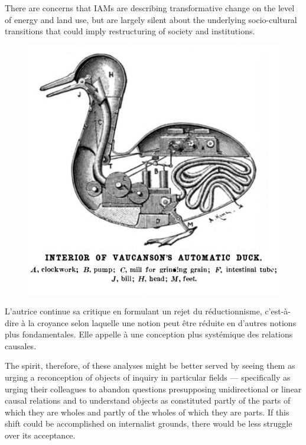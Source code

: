 \begin{authoredquote}
    There are concerns that IAMs are describing transformative change on the level of energy and land use, but are largely silent about the underlying socio-cultural transitions that could imply restructuring of society and institutions.
\end{authoredquote}


\begin{figure}
    \centering
    \includegraphics[width=0.6\linewidth]{reductionisme.png}
    \label{fig:reductionnisme}
\end{figure}



L'autrice continue sa critique en formulant un rejet du réductionnisme, c'est-à-dire à la croyance selon laquelle une notion peut être réduite en d'autres notions plus fondamentales. Elle appelle à une conception plus systémique des relations causales. 

\begin{authoredquote}
    The spirit, therefore, of these analyses might be better served by seeing them as urging a reconception of objects of inquiry in particular fields — specifically as urging their colleagues to abandon questions presupposing unidirectional or linear causal relations and to understand objects as constituted partly of the parts of which they are wholes and partly of the wholes of which they are parts. If this shift could be accomplished on internalist grounds, there would be less struggle over its acceptance.
\end{authoredquote}

